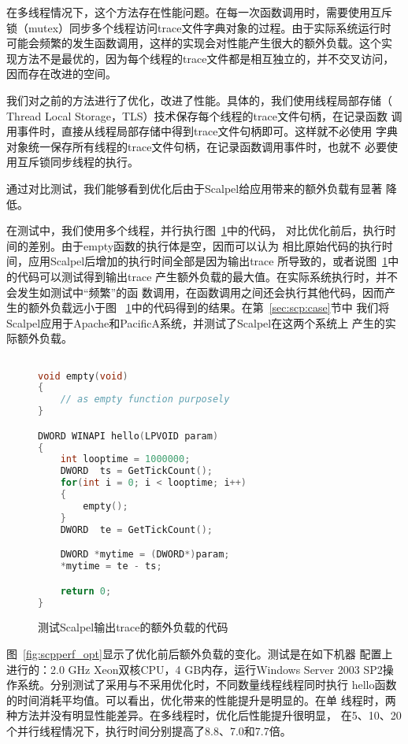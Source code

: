 在多线程情况下，这个方法存在性能问题。在每一次函数调用时，需要使用互斥
锁（mutex）同步多个线程访问trace文件字典对象的过程。由于实际系统运行时
可能会频繁的发生函数调用，这样的实现会对性能产生很大的额外负载。这个实
现方法不是最优的，因为每个线程的trace文件都是相互独立的，并不交叉访问，
因而存在改进的空间。

我们对之前的方法进行了优化，改进了性能。具体的，我们使用线程局部存储（
Thread Local Storage，TLS）技术保存每个线程的trace文件句柄，在记录函数
调用事件时，直接从线程局部存储中得到trace文件句柄即可。这样就不必使用
字典对象统一保存所有线程的trace文件句柄，在记录函数调用事件时，也就不
必要使用互斥锁同步线程的执行。

通过对比测试，我们能够看到优化后由于Scalpel给应用带来的额外负载有显著
降低。

在测试中，我们使用多个线程，并行执行图~\ref{fig:scp_perfcode}中的代码，
对比优化前后，执行时间的差别。由于empty函数的执行体是空，因而可以认为
相比原始代码的执行时间，应用Scalpel后增加的执行时间全部是因为输出trace
所导致的，或者说图~\ref{fig:scp_perfcode}中的代码可以测试得到输出trace
产生额外负载的最大值。在实际系统执行时，并不会发生如测试中“频繁”的函
数调用，在函数调用之间还会执行其他代码，因而产生的额外负载远小于图~
\ref{fig:scp_perfcode}中的代码得到的结果。在第~\ref{sec:scp:case}节中
我们将Scalpel应用于Apache和PacificA系统，并测试了Scalpel在这两个系统上
产生的实际额外负载。

\begin{figure}
\centering
\begin{lstlisting}[language=C++,basicstyle=\small]

void empty(void)
{
	// as empty function purposely
}

DWORD WINAPI hello(LPVOID param)
{
	int looptime = 1000000;
	DWORD  ts = GetTickCount();
	for(int i = 0; i < looptime; i++)
	{
		empty();
	}
	DWORD  te = GetTickCount();

	DWORD *mytime = (DWORD*)param;
	*mytime = te - ts;

	return 0;
}
\end{lstlisting}
\caption{测试Scalpel输出trace的额外负载的代码}
\label{fig:scp_perfcode}
\end{figure}

图~\ref{fig:scpperf_opt}显示了优化前后额外负载的变化。测试是在如下机器
配置上进行的：2.0 GHz Xeon双核CPU，4 GB内存，运行Windows Server 2003
SP2操作系统。分别测试了采用与不采用优化时，不同数量线程线程同时执行
hello函数的时间消耗平均值。可以看出，优化带来的性能提升是明显的。在单
线程时，两种方法并没有明显性能差异。在多线程时，优化后性能提升很明显，
在5、10、20个并行线程情况下，执行时间分别提高了8.8、7.0和7.7倍。

